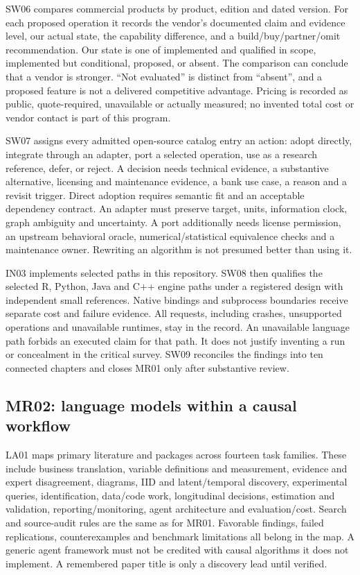 \documentclass[
  11pt,
  a4paper,
]{article}
\begin{document}
SW06 compares commercial products by product, edition and dated version.
For each proposed operation it records the vendor's documented claim and
evidence level, our actual state, the capability difference, and a
build/buy/partner/omit recommendation. Our state is one of implemented
and qualified in scope, implemented but conditional, proposed, or
absent. The comparison can conclude that a vendor is stronger. ``Not
evaluated'' is distinct from ``absent'', and a proposed feature is not a
delivered competitive advantage. Pricing is recorded as public,
quote-required, unavailable or actually measured; no invented total cost
or vendor contact is part of this program.

SW07 assigns every admitted open-source catalog entry an action: adopt
directly, integrate through an adapter, port a selected operation, use
as a research reference, defer, or reject. A decision needs technical
evidence, a substantive alternative, licensing and maintenance evidence,
a bank use case, a reason and a revisit trigger. Direct adoption
requires semantic fit and an acceptable dependency contract. An adapter
must preserve target, units, information clock, graph ambiguity and
uncertainty. A port additionally needs license permission, an upstream
behavioral oracle, numerical/statistical equivalence checks and a
maintenance owner. Rewriting an algorithm is not presumed better than
using it.

IN03 implements selected paths in this repository. SW08 then qualifies
the selected R, Python, Java and C++ engine paths under a registered
design with independent small references. Native bindings and subprocess
boundaries receive separate cost and failure evidence. All requests,
including crashes, unsupported operations and unavailable runtimes, stay
in the record. An unavailable language path forbids an executed claim
for that path. It does not justify inventing a run or concealment in the
critical survey. SW09 reconciles the findings into ten connected
chapters and closes MR01 only after substantive review.

\hypertarget{mr02-language-models-within-a-causal-workflow}{%
\subsection{MR02: language models within a causal
workflow}\label{mr02-language-models-within-a-causal-workflow}}

LA01 maps primary literature and packages across fourteen task families.
These include business translation, variable definitions and
measurement, evidence and expert disagreement, diagrams, IID and
latent/temporal discovery, experimental queries, identification,
data/code work, longitudinal decisions, estimation and validation,
reporting/monitoring, agent architecture and evaluation/cost. Search and
source-audit rules are the same as for MR01. Favorable findings, failed
replications, counterexamples and benchmark limitations all belong in
the map. A generic agent framework must not be credited with causal
algorithms it does not implement. A remembered paper title is only a
discovery lead until verified.
\end{document}
